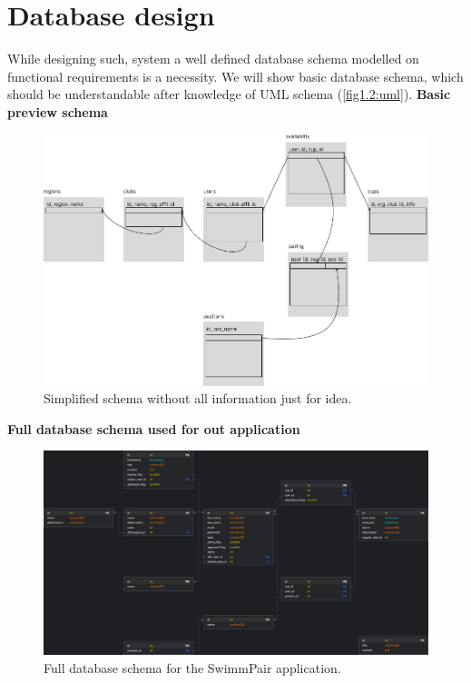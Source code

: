 \section{Database design}
While designing such, system a well defined database schema modelled on functional requirements is a necessity. We will show basic database schema, which should be understandable after knowledge of UML schema (\autoref{fig1.2:uml}).  
\newline
\textbf{Basic preview schema}
\begin{figure}[h]	
    \centering	
    \includegraphics[scale=0.33]{img/swimmpair_db_mockup.png}
    \caption{Simplified schema without all information just for idea.}
    \label{fig2.6:dbschemasimpl}
\end{figure}
\newline
\textbf{Full database schema used for out application}
\begin{figure}[h]	
	\centering	
    \includegraphics[scale=0.2175]{img/swimmpair_db_schema.png}
	\caption{Full database schema for the SwimmPair application.}
	\label{fig2.7:dbschemafull}
\end{figure}
